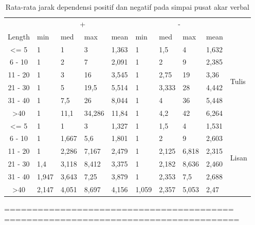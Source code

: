 \documentclass[10pt, a4paper, conference, compsocconf]{IEEEtran}
\begin{document}
\begin{table}
\begin{center}
\tiny
\caption{Rata-rata jarak dependensi positif dan negatif pada simpai pusat akar verbal}  \label{tab:deskriptif-mddpusat}
\begin{tabular}{c l l l l l l l l l}
\hline
 & \multicolumn{4}{c}{+} & \multicolumn{4}{c}{-} & \\  \cline{2-9}  
Length & min 	& med	& max 	& mean 	& min 	& med 	& max 	& mean 	& \\ \cline{1-10}  
\textless= 5 	& 1 		& 1 		& 3	 	& 1,363	& 1 		& 1,5		& 4	 	& 1,632	&\multirow{6}{*}{Tulis}\\
6 - 10 		& 1 		& 2		& 7	 	& 2,091	& 1 		& 2	 	& 9	 	& 2,385	& 	\\
11 - 20 		& 1 		& 3	 	& 16	 	& 3,545	& 1 		& 2,75 	& 19	 	& 3,36 	& 	\\
21 - 30 		& 1 		& 5	 	& 19,5 	& 5,514	& 1 		& 3,333	& 28		& 4,442	& 	\\ 
31 - 40 		& 1	 	& 7,5	 	& 26		& 8,044	& 1 		& 4		& 36		& 5,448	& 	\\
\textgreater 40 	& 1	 	& 11,1	& 34,286	& 11,84	& 1 		& 4,2		& 42		& 6,264	& 	\\ 
\hline
\textless= 5 	& 1 		& 1 		& 3		& 1,327	& 1 		& 1,5 	& 4		& 1,531	& \multirow{6}{*}{Lisan}\\
6 - 10 		& 1 		& 1,667	& 5,6		& 1,801	& 1 		& 2		& 9		& 2,603	& \\
11 - 20 		& 1 		& 2,286	& 7,167	& 2,479	& 1 		& 2,125	& 6,818	& 2,315	& \\
21 - 30 		& 1,4	 	& 3,118	& 8,412	& 3,375	& 1 		& 2,182	& 8,636	& 2,460	& \\ 
31 - 40 		& 1,947	& 3,643	& 7,25	& 3,879	& 1 		& 2,353	& 7,5		& 2,688	& \\
\textgreater 40 	& 2,147	 & 4,051	& 8,697	& 4,156	& 1,059	& 2,357	& 5,053	& 2,47	& \\ 
\hline
\end{tabular}
\end{center}
\end{table}

=========================================
==========================================
\end{document}
